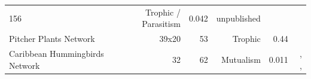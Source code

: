 \begin{longtable}[]{@{}lrrrrr@{}}
\begin{minipage}[t]{0.09\columnwidth}
156\strut
\end{minipage} & \begin{minipage}[t]{0.13\columnwidth}\raggedleft\strut
Trophic / Parasitism\strut
\end{minipage} & \begin{minipage}[t]{0.08\columnwidth}\raggedleft\strut
0.042\strut
\end{minipage} & \begin{minipage}[t]{0.27\columnwidth}\raggedleft\strut
unpublished\strut
\end{minipage}\tabularnewline
\begin{minipage}[t]{0.18\columnwidth}\raggedright\strut
Pitcher Plants Network\strut
\end{minipage} & \begin{minipage}[t]{0.08\columnwidth}\raggedleft\strut
39x20\strut
\end{minipage} & \begin{minipage}[t]{0.09\columnwidth}\raggedleft\strut
53\strut
\end{minipage} & \begin{minipage}[t]{0.13\columnwidth}\raggedleft\strut
Trophic\strut
\end{minipage} & \begin{minipage}[t]{0.08\columnwidth}\raggedleft\strut
0.44\strut
\end{minipage} & \begin{minipage}[t]{0.27\columnwidth}\raggedleft\strut
\citet{Baiser2012}\strut
\end{minipage}\tabularnewline
\begin{minipage}[t]{0.18\columnwidth}\raggedright\strut
Caribbean Hummingbirds Network\strut
\end{minipage} & \begin{minipage}[t]{0.08\columnwidth}\raggedleft\strut
32\strut
\end{minipage} & \begin{minipage}[t]{0.09\columnwidth}\raggedleft\strut
62\strut
\end{minipage} & \begin{minipage}[t]{0.13\columnwidth}\raggedleft\strut
Mutualism\strut
\end{minipage} & \begin{minipage}[t]{0.08\columnwidth}\raggedleft\strut
0.011\strut
\end{minipage} & \begin{minipage}[t]{0.27\columnwidth}\raggedleft\strut
\citet{MartinGonzalez2015}, \citet{Sonne2016}, \citet{Lack1973}\strut

\end{minipage}
\end{longtable}
